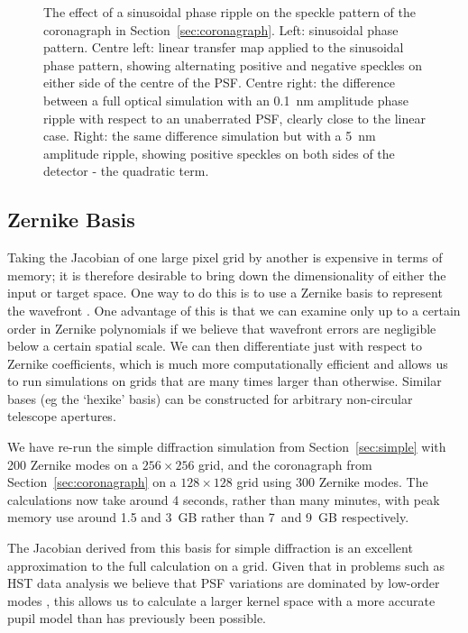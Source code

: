 \documentclass[modern]{aastex63}
\begin{document}
\begin{figure}
\caption{The effect of a sinusoidal phase ripple on the speckle pattern of the coronagraph in Section~\ref{sec:coronagraph}. Left: sinusoidal phase pattern. Centre left: linear transfer map applied to the sinusoidal phase pattern, showing alternating positive and negative speckles on either side of the centre of the PSF. Centre right: the difference between a full optical simulation with an 0.1~nm amplitude phase ripple with respect to an unaberrated PSF, clearly close to the linear case. Right: the same difference simulation but with a 5~nm amplitude ripple, showing positive speckles on both sides of the detector - the quadratic term. \href{https://github.com/benjaminpope/morphine/blob/stable/notebooks/morphine_coronagraph.ipynb}{\color{linkcolor}\faGithub}
\label{corona_nonlinearity}}
\end{figure}

\subsection{Zernike Basis}
\label{zernike}

Taking the Jacobian of one large pixel grid by another is expensive in terms of memory; it is therefore desirable to bring down the dimensionality of either the input or target space. One way to do this is to use a Zernike basis to represent the wavefront \citep{zernike34}. One advantage of this is that we can examine only up to a certain order in Zernike polynomials if we believe that wavefront errors are negligible below a certain spatial scale. We can then differentiate just with respect to Zernike coefficients, which is much more computationally efficient and allows us to run simulations on grids that are many times larger than otherwise. Similar bases (eg the `hexike' basis) can be constructed for arbitrary non-circular telescope apertures.

We have re-run the simple diffraction simulation from Section~\ref{sec:simple} with 200 Zernike modes on a $256\times256$ grid, and the coronagraph from Section~\ref{sec:coronagraph} on a $128\times128$ grid using 300 Zernike modes. The calculations now take around 4 seconds, rather than many minutes, with peak memory use around 1.5 and 3~GB rather than 7~and 9~GB respectively. 

The Jacobian derived from this basis for simple diffraction is an excellent approximation to the full calculation on a grid. Given that in problems such as HST data analysis we believe that PSF variations are dominated by low-order modes \citep{lallo06}, this allows us to calculate a larger kernel space with a more accurate pupil model than has previously been possible. 
\end{document}
